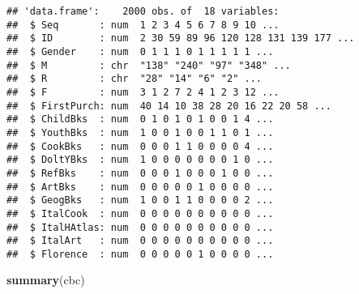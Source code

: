 \documentclass[
]{article}
\newenvironment{Shaded}{\begin{snugshade}}{\end{snugshade}}
\newcommand{\FunctionTok}[1]{\textcolor[rgb]{0.13,0.29,0.53}{\textbf{#1}}}
\newcommand{\NormalTok}[1]{#1}
\begin{document}
\begin{verbatim}
## 'data.frame':    2000 obs. of  18 variables:
##  $ Seq       : num  1 2 3 4 5 6 7 8 9 10 ...
##  $ ID        : num  2 30 59 89 96 120 128 131 139 177 ...
##  $ Gender    : num  0 1 1 1 0 1 1 1 1 1 ...
##  $ M         : chr  "138" "240" "97" "348" ...
##  $ R         : chr  "28" "14" "6" "2" ...
##  $ F         : num  3 1 2 7 2 4 1 2 3 12 ...
##  $ FirstPurch: num  40 14 10 38 28 20 16 22 20 58 ...
##  $ ChildBks  : num  0 1 0 1 0 1 0 0 1 4 ...
##  $ YouthBks  : num  1 0 0 1 0 0 1 1 0 1 ...
##  $ CookBks   : num  0 0 0 1 1 0 0 0 0 4 ...
##  $ DoltYBks  : num  1 0 0 0 0 0 0 0 1 0 ...
##  $ RefBks    : num  0 0 0 1 0 0 0 1 0 0 ...
##  $ ArtBks    : num  0 0 0 0 0 1 0 0 0 0 ...
##  $ GeogBks   : num  1 0 0 1 1 0 0 0 0 2 ...
##  $ ItalCook  : num  0 0 0 0 0 0 0 0 0 0 ...
##  $ ItalHAtlas: num  0 0 0 0 0 0 0 0 0 0 ...
##  $ ItalArt   : num  0 0 0 0 0 0 0 0 0 0 ...
##  $ Florence  : num  0 0 0 0 0 1 0 0 0 0 ...
\end{verbatim}

\begin{Shaded}
\begin{Highlighting}[]
\FunctionTok{summary}\NormalTok{(cbc)}
\end{Highlighting}
\end{Shaded}
\end{document}
